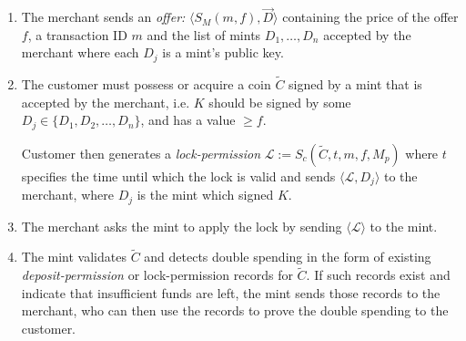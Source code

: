 \documentclass{llncs}
\begin{document}
\begin{enumerate}
\item\label{offer2} The merchant sends an \emph{offer:} $\langle S_M(m, f),
  \vec{D} \rangle$ containing the price of the offer $f$, a transaction
  ID $m$ and the list of mints $D_1, \ldots, D_n$ accepted by the merchant
  where each $D_j$ is a mint's public key.
\item\label{lock2} The customer must possess or acquire a coin $\widetilde{C}$
  signed by a mint that is
  accepted by the merchant, i.e. $K$ should be signed by some $D_j
  \in \{D_1, D_2, \ldots, D_n\}$, and has a value $\geq f$.

  Customer then generates a \emph{lock-permission} $\mathcal{L} :=
  S_c(\widetilde{C}, t, m, f, M_p)$ where $t$ specifies the time until which the
  lock is valid and sends $\langle \mathcal{L}, D_j\rangle$ to the merchant,
  where $D_j$ is the mint which signed $K$.
\item The merchant asks the mint to apply the lock by sending $\langle
  \mathcal{L} \rangle$ to the mint.
\item The mint validates $\widetilde{C}$ and detects double spending
  in the form of existing \emph{deposit-permission} or
  lock-permission records for $\widetilde{C}$.  If such records exist
  and indicate that insufficient funds are left, the mint sends those
  records to the merchant, who can then use the records to prove the double
  spending to the customer.


\end{enumerate}
\end{document}
